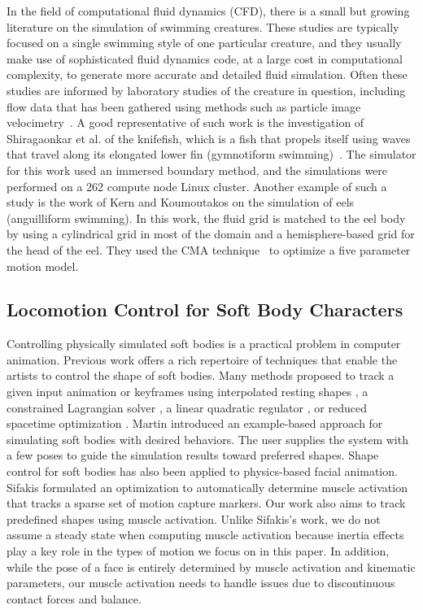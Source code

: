 In the field of computational fluid dynamics (CFD), there is a small but
growing literature on the simulation of swimming creatures.  These studies
are typically focused on a single swimming style of one particular creature,
and they usually make use of sophisticated fluid dynamics code, at a large cost in
computational complexity, to generate more accurate and detailed fluid simulation. Often these studies are informed by laboratory
studies of the creature in question, including flow data that has been
gathered using methods such as particle image
velocimetry~\cite{grant1997particle}.  A good representative of such work is
the investigation of Shiragaonkar et al. of the knifefish, which is a fish
that propels itself using waves that travel along its elongated lower fin
(gymnotiform swimming)~\cite{shirgaonkar2008hydrodynamics}.  The simulator
for this work used an immersed boundary method, and the simulations were
performed on a 262 compute node Linux cluster.  Another example of such a
study is the work of Kern and Koumoutakos \cite{kern2006simulations} on the simulation of eels
(anguilliform swimming).  In this work, the fluid
grid is matched to the eel body by using a cylindrical grid in most of the
domain and a hemisphere-based grid for the head of the eel.  They used the
CMA technique~\cite{hansen2004evaluating} to optimize a five parameter
motion model.

\subsection{Locomotion Control for Soft Body Characters}

Controlling physically simulated soft bodies is a practical problem in
computer animation. Previous work offers a rich repertoire of
techniques that enable the artists to control the shape of soft
bodies. Many methods proposed to track a given input animation or
keyframes using interpolated resting shapes \cite{Kondo:2005}, a
constrained Lagrangian solver \cite{Bergou:2007}, a linear quadratic
regulator \cite{Barbic:2008}, or reduced spacetime optimization
\cite{Barbic:2009}. Martin \etal \cite{Martin:2011} introduced an
example-based approach for simulating soft bodies with desired
behaviors. The user supplies the system with a few poses to guide the
simulation results toward preferred shapes. Shape control for soft
bodies has also been applied to physics-based facial
animation. Sifakis \cite{Sifakis:2005} formulated an optimization
to automatically determine muscle activation that tracks a sparse set
of motion capture markers. Our work also aims to track predefined
shapes using muscle activation. Unlike Sifakis's work, we do not
assume a steady state when computing muscle activation because inertia
effects play a key role in the types of motion we focus on in this
paper. In addition, while the pose of a face is entirely determined by
muscle activation and kinematic parameters, our muscle activation
needs to handle issues due to discontinuous contact forces and
balance.

